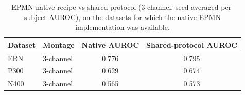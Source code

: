 \begin{table}[t]
\centering
\setlength{\tabcolsep}{6pt}
\caption{EPMN native recipe vs shared protocol (3-channel, seed-averaged per-subject AUROC), on the datasets for which the native EPMN implementation was available.}
\label{tab:epmn-native}
\begin{tabular}{llcc}
\toprule
Dataset & Montage & Native AUROC & Shared-protocol AUROC \\
\midrule
ERN & 3-channel & 0.776 & 0.795 \\
P300 & 3-channel & 0.629 & 0.674 \\
N400 & 3-channel & 0.565 & 0.573 \\
\bottomrule
\end{tabular}
\end{table}
